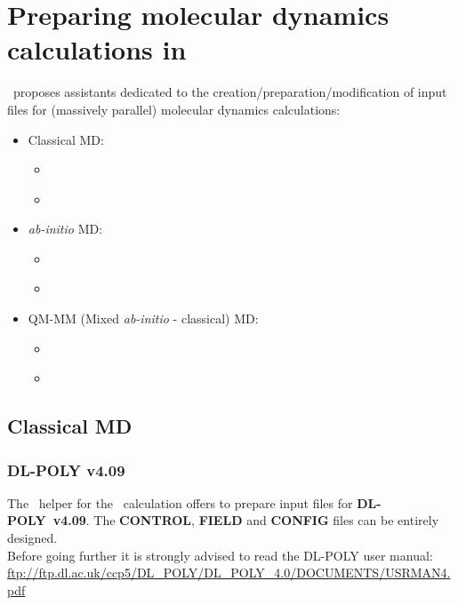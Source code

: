 \chapter{Preparing molecular dynamics calculations in \atomes}
\label{md}

\atomes\ proposes assistants dedicated to the creation/preparation/modification of input files for (massively parallel) molecular dynamics calculations: 
\begin{itemize}
\item Classical MD:
\begin{itemize}
\item \dlpoly\ \cite{DLPOLY}
\item \lammps\ \cite{LAMMPS}
\end{itemize}
\item {\em{ab-initio}} MD:
\begin{itemize}
\item \cpmd\ \cite{CPMD}
\item \cptk\ \cite{CP2K}
\end{itemize}
\item QM-MM (Mixed {\em{ab-initio}} - classical) MD:
\begin{itemize}
\item \cpmd\ \cite{CPMD}
\item \cptk\ \cite{CP2K}
\end{itemize}
\end{itemize}

\section{Classical MD}

\subsection{DL-POLY v4.09}

The \atomes\ helper for the \dlpoly\ calculation offers to prepare input files for {\bf{DL-POLY~v4.09}}. 
The {\bf{CONTROL}}, {\bf{FIELD}} and {\bf{CONFIG}} files can be entirely designed. \\
Before going further it is strongly advised to read the DL-POLY user manual: \\[0.25cm]

\href{ftp://ftp.dl.ac.uk/ccp5/DL\_POLY/DL\_POLY\_4.0/DOCUMENTS/USRMAN4.pdf}{ftp://ftp.dl.ac.uk/ccp5/DL\_POLY/DL\_POLY\_4.0/DOCUMENTS/USRMAN4.pdf}

